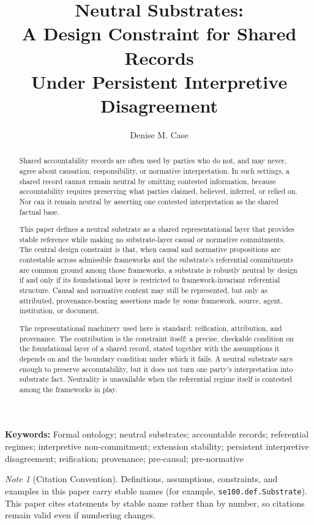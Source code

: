 \documentclass[11pt]{article}
\title{
Neutral Substrates:\\
A Design Constraint for Shared Records\\
Under Persistent Interpretive Disagreement
}
\author{Denise M. Case}
\affil{\small Department of Computer Science and Information Systems\\
Northwest Missouri State University, Maryville, MO, USA\\}
\date{}
\theoremstyle{plain}
\theoremstyle{definition}
\theoremstyle{remark}
\newtheorem*{note*}{Note}
\providecommand{\keywords}[1]{\vspace{0.5em}\noindent\textbf{Keywords: }\small #1}
\begin{document}
\maketitle
\vspace{-2em}

\begin{abstract}
  Shared accountability records are often used
  by parties who do not, and may never,
  agree about causation, responsibility, or normative interpretation.
  In such settings, a shared record cannot remain neutral
  by omitting contested information,
  because accountability requires preserving what parties
  claimed, believed, inferred, or relied on.
  Nor can it remain neutral
  by asserting one contested interpretation as the shared factual base.

  This paper defines a neutral substrate as a shared representational layer
  that provides stable reference
  while making no substrate-layer causal or normative commitments.
  The central design constraint is that,
  when causal and normative propositions are
  contestable across admissible frameworks and
  the substrate's referential commitments
  are common ground among those frameworks,
  a substrate is robustly neutral by design
  if and only if its foundational layer is restricted to
  framework-invariant referential structure.
  Causal and normative content may still be represented,
  but only as attributed, provenance-bearing assertions
  made by some framework, source, agent, institution, or document.

  The representational machinery used here is standard:
  reification, attribution, and provenance.
  The contribution is the constraint itself:
  a precise, checkable condition on the foundational layer of a shared record,
  stated together with the assumptions it depends on and the boundary condition
  under which it fails.
  A neutral substrate says enough to preserve accountability,
  but it does not turn one party's interpretation into substrate fact.
  Neutrality is unavailable when the referential regime itself is
  contested among the frameworks in play.
\end{abstract}

\keywords{
  Formal ontology;
  neutral substrates;
  accountable records;
  referential regimes;
  interpretive non-commitment;
  extension stability;
  persistent interpretive disagreement;
  reification;
  provenance;
  pre-causal;
  pre-normative
}

\begin{note*}[Citation Convention]
  Definitions, assumptions, constraints, and examples in this paper carry stable
  names (for example, \texttt{se100.def.Substrate}).
  This paper cites statements by stable name rather than by number,
  so citations remain valid even if numbering changes.
\end{note*}
\end{document}
